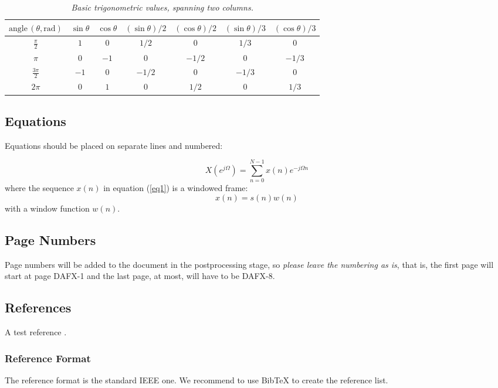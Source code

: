 \documentclass[twoside,a4paper]{article}
\begin{document}
\begin{table*}[ht]
  \caption{{\it Basic trigonometric values, spanning two columns.}}
	\centering
  \begin{tabular}{|c|c|c|c|c|c|c|}\hline
    $\mathrm{angle}\, (\theta, \mathrm{rad})$ & $\sin \theta$ & $\cos \theta $ & $(\sin \theta)/2 $ & $(\cos \theta) /2 $ & $(\sin \theta)/3 $ & $(\cos \theta)/3$    \\\hline
    $\frac{\pi}{2}$ & $1$ & $0$ & $1/2$ & $0$ & $1/3$ & $0$ \\
    $\pi$ & $0$ & $-1$ & $0$ & $-1/2$ & $0$ & $-1/3$\\
    $\frac{3\pi}{2}$ & $-1$ & $0$ & $-1/2$ & $0$ & $-1/3$ & $0$ \\
    $2\pi$ & $0$ & $1$ & $0$ & $1/2$ & $0$ & $1/3$ \\\hline
 \end{tabular}
  \label{tab:example2}
\end{table*}

\subsection{Equations}
Equations should be placed on separate lines and numbered:

\begin{equation}
	X(e^{j\Omega})=\sum_{n=0}^{N-1}x(n)e^{-j\Omega n}
	\label{eq1}
	\end{equation}
	where the sequence $x(n)$ in equation (\ref{eq1}) is a windowed frame:
	\begin{equation}
	x(n)=s(n) w(n)
	\label{eq2}
\end{equation}
%
with a window function $w(n)$.


\subsection{Page Numbers}
Page numbers will be added to the document in the postprocessing stage, so {\em please leave the numbering as is},
that is, the first page will start at page DAFX-1 and the last page, at most, will have to be DAFX-8.


\subsection{References}
A test reference \cite{betser2009sinusoidal}.

\subsubsection{Reference Format}
The reference format is the standard IEEE one. We recommend to use BibTeX to create the reference list.
\end{document}
